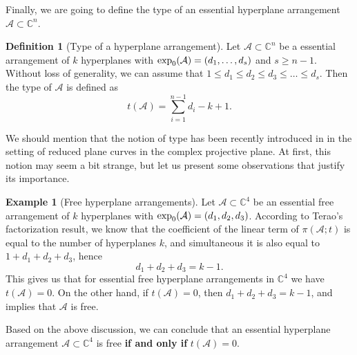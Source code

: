 \documentclass[11pt]{article}
\theoremstyle{plain}
\theoremstyle{definition}
\newtheorem{definition}[thm]{Definition}
\newtheorem{example}[thm]{Example}
\begin{document}
Finally, we are going to define the type of an essential hyperplane arrangement $\mathcal{A}\subset \mathbb{C}^{n}$.
\begin{definition}[Type of a hyperplane arrangement]
Let $\mathcal{A} \subset \mathbb{C}^{n}$ be a essential arrangement of $k$ hyperplanes with ${\rm exp}_{0}(\mathcal{A}) = (d_{1}, \ldots, d_{s})$ and $s\geq n-1$. Without loss of generality, we can assume that $1 \leq d_{1} \leq d_{2} \leq d_{3} \leq \ldots \leq d_{s}$.
Then the type of $\mathcal{A}$ is defined as
$$t(\mathcal{A}) = \sum_{i=1}^{n-1} d_{i} - k + 1.$$
\end{definition}
We should mention that the notion of type has been recently introduced in \cite{her} in the setting of reduced plane curves in the complex projective plane. At first, this notion may seem a bit strange, but let us present some observations that justify its importance.
\begin{example}[Free hyperplane arrangements]
Let $\mathcal{A} \subset \mathbb{C}^{4}$ be an essential free arrangement of $k$ hyperplanes with ${\rm exp}_{0}(\mathcal{A}) = (d_{1}, d_{2}, d_{3}) $. According to Terao's factorization result, we know that the coefficient of the linear term of $\pi(\mathcal{A};t)$ is equal to the number of hyperplanes $k$, and simultaneous it is also equal to $1+ d_{1}+d_{2}+d_{3}$, hence 
$$d_{1}+d_{2}+d_{3}=k-1.$$
This gives us that for essential free hyperplane arrangements in $\mathbb{C}^{4}$ we have $t(\mathcal{A}) = 0$. On the other hand, if $t(\mathcal{A}) = 0$, then $d_{1}+d_{2}+d_{3}=k-1$, and \cite[Lemma 4.12]{DS} implies that $\mathcal{A}$ is free.

Based on the above discussion, we can conclude that an essential hyperplane arrangement $\mathcal{A} \subset \mathbb{C}^{4}$ is free \textbf{if and only if} $t(\mathcal{A})=0$.
\end{example}
\end{document}
